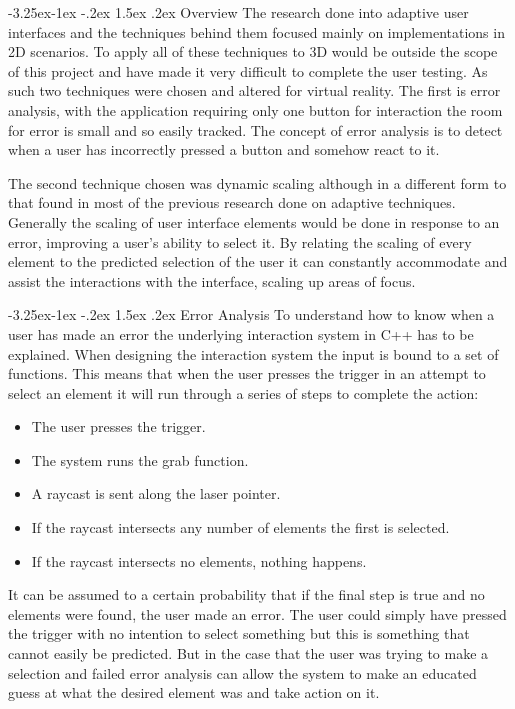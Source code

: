 \documentclass[12pt]{article}
\makeatletter
\renewcommand{\subsubsection}{\@startsection{subsubsection}{2}{\z@}%
             {-3.25ex\@plus -1ex \@minus -.2ex}%
             {1.5ex \@plus .2ex}%
             {\normalfont\normalsize\scshape\bfseries}}
\makeatother
\begin{document}
\subsubsection{Overview}
The research done into adaptive user interfaces and the techniques behind them focused mainly on implementations in 2D scenarios. To apply all of these techniques to 3D would be outside the scope of this project and have made it very difficult to complete the user testing. As such two techniques were chosen and altered for virtual reality. The first is error analysis, with the application requiring only one button for interaction the room for error is small and so easily tracked. The concept of error analysis is to detect when a user has incorrectly pressed a button and somehow react to it.

The second technique chosen was dynamic scaling although in a different form to that found in most of the previous research done on adaptive techniques. Generally the scaling of user interface elements would be done in response to an error, improving a user's ability to select it. By relating the scaling of every element to the predicted selection of the user it can constantly accommodate and assist the interactions with the interface, scaling up areas of focus.

\subsubsection{Error Analysis}
To understand how to know when a user has made an error the underlying interaction system in C++ has to be explained. When designing the interaction system the input is bound to a set of functions. This means that when the user presses the trigger in an attempt to select an element it will run through a series of steps to complete the action:

\begin{itemize}[noitemsep,topsep=0pt]
\item The user presses the trigger.
\item The system runs the grab function.
\item A raycast is sent along the laser pointer.
\item If the raycast intersects any number of elements the first is selected.
\item If the raycast intersects no elements, nothing happens.
\end{itemize}

It can be assumed to a certain probability that if the final step is true and no elements were found, the user made an error. The user could simply have pressed the trigger with no intention to select something but this is something that cannot easily be predicted. But in the case that the user was trying to make a selection and failed error analysis can allow the system to make an educated guess at what the desired element was and take action on it. 
\end{document}
